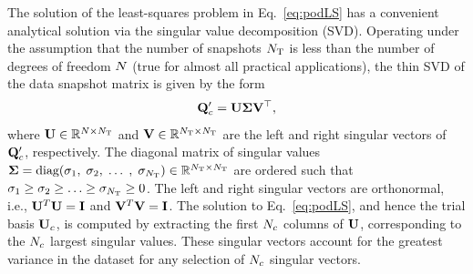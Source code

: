 The solution of the least-squares problem in Eq.~\ref{eq:podLS} has a convenient analytical solution via the singular value decomposition (SVD). Operating under the assumption that the number of snapshots $N_{\text{T}}$ is less than the number of degrees of freedom $N$ (true for almost all practical applications), the thin SVD of the data snapshot matrix is given by the form
\begin{equation}\label{eq:svd}
    \consDataMatUns = \leftEvecMat \singVecMat \rightEvecMat^\top,
\end{equation}
where $\leftEvecMat \inRTwo{\numDOF}{\numSnaps}$ and $\rightEvecMat \inRTwo{\numSnaps}{\numSnaps}$ are the left and right singular vectors of $\consDataMatUns$, respectively. The diagonal matrix of singular values $\boldsymbol{\Sigma} = \text{diag}(\sigma_1, \; \sigma_2, \; \hdots \;, \; \sigma_{N_{\text{T}}}) \in \mathbb{R}^{N_{\text{T}} \times N_{\text{T}}}$ are ordered such that $\sigma_1 \geq \sigma_2 \geq \hdots \geq \sigma_{N_{\text{T}}} \geq 0 $. The left and right singular vectors are orthonormal, i.e., $\leftEvecMat^T \leftEvecMat = \identMat$ and $\rightEvecMat^T \rightEvecMat = \identMat$. The solution to Eq.~\ref{eq:podLS}, and hence the trial basis $\consTrial$, is computed by extracting the first $N_c$ columns of $\leftEvecMat$, corresponding to the $N_c$ largest singular values. These singular vectors account for the greatest variance in the dataset for any selection of $N_c$ singular vectors.

